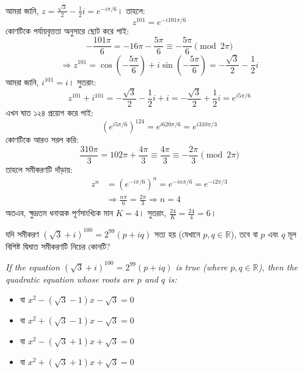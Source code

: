 \documentclass[12pt, a4paper]{article}
\begin{document}
\begin{tcolorbox}[solutionbox={সমাধান (Solution)}]
    \noindent
    আমরা জানি, $z = \frac{\sqrt{3}}{2} - \frac{1}{2}i = e^{-i\pi/6}$। তাহলে:
    \[ z^{101} = e^{-i 101\pi/6} \]
    কোণটিকে পর্যায়বৃত্ততা অনুসারে ছোট করে পাই:
    \[ -\frac{101\pi}{6} = -16\pi - \frac{5\pi}{6} \equiv -\frac{5\pi}{6} \pmod{2\pi} \]
    \[ \Rightarrow z^{101} = \cos\left(-\frac{5\pi}{6}\right) + i\sin\left(-\frac{5\pi}{6}\right) = -\frac{\sqrt{3}}{2} - \frac{1}{2}i \]
    আমরা জানি, $i^{101} = i$। সুতরাং:
    \[ z^{101} + i^{101} = -\frac{\sqrt{3}}{2} - \frac{1}{2}i + i = -\frac{\sqrt{3}}{2} + \frac{1}{2}i = e^{i 5\pi/6} \]
    এখন ঘাত ১২৪ প্রয়োগ করে পাই:
    \[ (e^{i 5\pi/6})^{124} = e^{i 620\pi/6} = e^{i 310\pi/3} \]
    কোণটিকে আরও সরল করি:
    \[ \frac{310\pi}{3} = 102\pi + \frac{4\pi}{3} \equiv \frac{4\pi}{3} \equiv -\frac{2\pi}{3} \pmod{2\pi} \]
    তাহলে সমীকরণটি দাঁড়ায়:
    \begin{align*}
        z^n &= (e^{-i\pi/6})^n = e^{-i n\pi/6} = e^{-i 2\pi/3} \\
        &\Rightarrow \frac{n\pi}{6} = \frac{2\pi}{3} \Rightarrow n = 4
    \end{align*}
    অতএব, ক্ষুদ্রতম ধনাত্মক পূর্ণসাংখ্যিক মান $K = 4$। সুতরাং, $\frac{24}{K} = \frac{24}{4} = 6$।
\end{tcolorbox}

\vspace{1em}

\begin{tcolorbox}[questionbox={প্রশ্ন (Question) 21}]
    \noindent
    যদি সমীকরণ $(\sqrt{3} + i)^{100} = 2^{99}(p + iq)$ সত্য হয় (যেখানে $p, q \in \mathbb{R}$), তবে বা $p$ এবং $q$ মূল বিশিষ্ট দ্বিঘাত সমীকরণটি নিচের কোনটি?
    
    \vspace{0.8em}
    \begin{english}
    \noindent\textit{\color{darkgray}
    If the equation $(\sqrt{3} + i)^{100} = 2^{99}(p + iq)$ is true (where $p, q \in \mathbb{R}$), then the quadratic equation whose roots are $p$ and $q$ is:
    }
    \end{english}
\end{tcolorbox}

\begin{itemize}[label={}, leftmargin=1cm, itemsep=0.5em]
    \item[\textbf{A)}] বা $x^2 - (\sqrt{3}-1)x - \sqrt{3} = 0$
    \item[\textbf{B)}] বা $x^2 + (\sqrt{3}-1)x - \sqrt{3} = 0$
    \item[\textbf{C)}] বা $x^2 - (\sqrt{3}+1)x + \sqrt{3} = 0$
    \item[\textbf{D)}] বা $x^2 + (\sqrt{3}+1)x + \sqrt{3} = 0$
\end{itemize}
\end{document}
